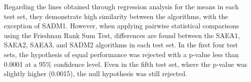 			
			
			Regarding the lines obtained through regression analysis for the means in each test set, they demonstrate high similarity between the algorithms, with the exception of SADM1. However, when applying pairwise statistical comparisons using the Friedman Rank Sum Test, differences are found between the SAEA1, SAEA2, SAEA3, and SADM2 algorithms in each test set. In the first four test sets, the hypothesis of equal performance was rejected with a p-value less than 0.0001 at a 95\% confidence level. Even in the fifth test set, where the p-value was slightly higher (0.0015), the null hypothesis was still rejected.
			
